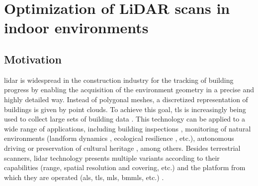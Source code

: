 \section{Optimization of LiDAR scans in indoor environments}

\subsection{Motivation} 

\acrshort{lidar} is widespread in the construction industry for the tracking of building progress by enabling the acquisition of the environment geometry in a precise and highly detailed way. Instead of polygonal meshes, a discretized representation of buildings is given by point clouds. To achieve this goal, \acrshort{tls} is increasingly being used to collect large sets of building data \cite{pandzic_error_2017}. This technology can be applied to a wide range of applications, including building inspections \cite{shariq_revolutionising_2020}, monitoring of natural environments (landform dynamics \cite{guisado-pintado_3d_2019}, ecological resilience \cite{mitasova_geospatial_2010}, etc.), autonomous driving \cite{kuutti_survey_2021} or preservation of cultural heritage \cite{banfi_integration_2019, ham_phased_2020, andriasyan_point_2020}, among others. Besides terrestrial scanners, \acrshort{lidar} technology presents multiple variants according to their capabilities (range, spatial resolution and covering, etc.) and the platform from which they are operated (\acrshort{als}, \acrshort{tls}, \acrshort{mls}, \acrshort{bmmls}, etc.) \cite{poux_smart_2019, warchol_concept_2019}. 

